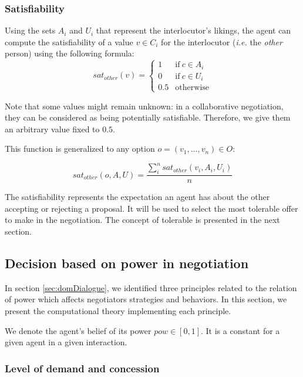 \documentclass{llncs}
\begin{document}
		\subsubsection*{Satisfiability}
		Using the sets $A_i$ and $U_i$ that represent the interlocutor's likings, the agent can compute the satisfiability of a value $v\in C_i$ for the interlocutor (\emph{i.e.} the \emph{other} person) using the following formula:
		\vspace{-0.5em} 
		\begin{equation}
		sat_{other}(v)= \left\{\begin{array}{ll}
		1	 & \mathrm{if\ }  c \in A_i\\
		0    & \mathrm{if\ }c \in U_i\\
		0.5	 & \mathrm{otherwise}
		\end{array}\right.
		\end{equation}
		
		Note that some values might remain unknown: in a collaborative negotiation, they can be considered as being potentially satisfiable. Therefore, we give them an arbitrary value fixed to $0.5$.
		
		This function is generalized to any option $o=(v_1,\ldots,v_n) \in O$:
		
		\begin{equation}
		sat_{other}(o, A, U) = \frac{ \sum_{i}^{n} sat_{other}(v_i, A_i, U_i) } {n}
		\end{equation}
		
		The satisfiability represents the expectation an agent has about the other accepting or rejecting a proposal. It will be used to select the most tolerable offer to make in the negotiation. The concept of tolerable is presented in the next section.
		
		\subsection{Decision based on power in negotiation}
		\label{sec:decision}
		
		In section \ref{sec:domDialogue}, we identified three principles related to the relation of power which affects negotiators strategies and behaviors. In this section, we present the computational theory implementing each principle. 
		
		We denote the agent's belief of its  power $pow \in [0, 1]$. It is a constant for a given agent in a given interaction.
		
		
		\subsubsection{Level of demand and concession}
	
\end{document}
